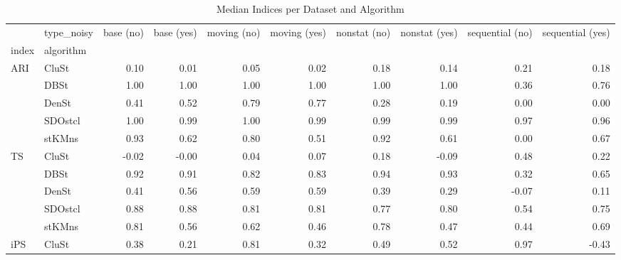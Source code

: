 \begin{table}
\centering
\caption{Median Indices per Dataset and Algorithm}
\label{tab:median_indices}
\begin{tabular}{llrrrrrrrr}
\toprule
     & type\_noisy &  base (no) &  base (yes) &  moving (no) &  moving (yes) &  nonstat (no) &  nonstat (yes) &  sequential (no) &  sequential (yes) \\
index & algorithm &            &             &              &               &               &                &                  &                   \\
\midrule
ARI & CluSt &       0.10 &        0.01 &         0.05 &          0.02 &          0.18 &           0.14 &             0.21 &              0.18 \\
     & DBSt &       1.00 &        1.00 &         1.00 &          1.00 &          1.00 &           1.00 &             0.36 &              0.76 \\
     & DenSt &       0.41 &        0.52 &         0.79 &          0.77 &          0.28 &           0.19 &             0.00 &              0.00 \\
     & SDOstcl &       1.00 &        0.99 &         1.00 &          0.99 &          0.99 &           0.99 &             0.97 &              0.96 \\
     & stKMns &       0.93 &        0.62 &         0.80 &          0.51 &          0.92 &           0.61 &             0.00 &              0.67 \\
TS & CluSt &      -0.02 &       -0.00 &         0.04 &          0.07 &          0.18 &          -0.09 &             0.48 &              0.22 \\
     & DBSt &       0.92 &        0.91 &         0.82 &          0.83 &          0.94 &           0.93 &             0.32 &              0.65 \\
     & DenSt &       0.41 &        0.56 &         0.59 &          0.59 &          0.39 &           0.29 &            -0.07 &              0.11 \\
     & SDOstcl &       0.88 &        0.88 &         0.81 &          0.81 &          0.77 &           0.80 &             0.54 &              0.75 \\
     & stKMns &       0.81 &        0.56 &         0.62 &          0.46 &          0.78 &           0.47 &             0.44 &              0.69 \\
iPS & CluSt &       0.38 &        0.21 &         0.81 &          0.32 &          0.49 &           0.52 &             0.97 &             -0.43 \\

\end{tabular}
\end{table}
